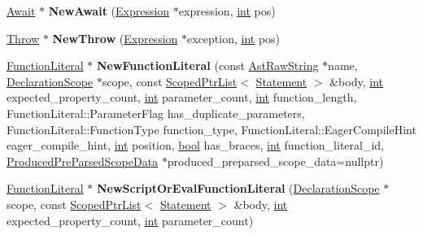\begin{DoxyCompactItemize}
\item 
\mbox{\label{classv8_1_1internal_1_1AstNodeFactory_abbd2b63d8ad08a73e63a917e9ab60847}} 
\mbox{\hyperlink{classv8_1_1internal_1_1Await}{Await}} $\ast$ {\bfseries New\+Await} (\mbox{\hyperlink{classv8_1_1internal_1_1Expression}{Expression}} $\ast$expression, \mbox{\hyperlink{classint}{int}} pos)
\item 
\mbox{\label{classv8_1_1internal_1_1AstNodeFactory_a1fdf2695d0243e1656cae73a01450f29}} 
\mbox{\hyperlink{classv8_1_1internal_1_1Throw}{Throw}} $\ast$ {\bfseries New\+Throw} (\mbox{\hyperlink{classv8_1_1internal_1_1Expression}{Expression}} $\ast$exception, \mbox{\hyperlink{classint}{int}} pos)
\item 
\mbox{\label{classv8_1_1internal_1_1AstNodeFactory_ad8aa2939934a2450217b7fa5eeca9d72}} 
\mbox{\hyperlink{classv8_1_1internal_1_1FunctionLiteral}{Function\+Literal}} $\ast$ {\bfseries New\+Function\+Literal} (const \mbox{\hyperlink{classv8_1_1internal_1_1AstRawString}{Ast\+Raw\+String}} $\ast$name, \mbox{\hyperlink{classv8_1_1internal_1_1DeclarationScope}{Declaration\+Scope}} $\ast$scope, const \mbox{\hyperlink{classv8_1_1internal_1_1ScopedPtrList}{Scoped\+Ptr\+List}}$<$ \mbox{\hyperlink{classv8_1_1internal_1_1Statement}{Statement}} $>$ \&body, \mbox{\hyperlink{classint}{int}} expected\+\_\+property\+\_\+count, \mbox{\hyperlink{classint}{int}} parameter\+\_\+count, \mbox{\hyperlink{classint}{int}} function\+\_\+length, Function\+Literal\+::\+Parameter\+Flag has\+\_\+duplicate\+\_\+parameters, Function\+Literal\+::\+Function\+Type function\+\_\+type, Function\+Literal\+::\+Eager\+Compile\+Hint eager\+\_\+compile\+\_\+hint, \mbox{\hyperlink{classint}{int}} position, \mbox{\hyperlink{classbool}{bool}} has\+\_\+braces, \mbox{\hyperlink{classint}{int}} function\+\_\+literal\+\_\+id, \mbox{\hyperlink{classv8_1_1internal_1_1ProducedPreParsedScopeData}{Produced\+Pre\+Parsed\+Scope\+Data}} $\ast$produced\+\_\+preparsed\+\_\+scope\+\_\+data=nullptr)
\item 
\mbox{\label{classv8_1_1internal_1_1AstNodeFactory_aa708ce9a873dde8c1338cd5109aecdf0}} 
\mbox{\hyperlink{classv8_1_1internal_1_1FunctionLiteral}{Function\+Literal}} $\ast$ {\bfseries New\+Script\+Or\+Eval\+Function\+Literal} (\mbox{\hyperlink{classv8_1_1internal_1_1DeclarationScope}{Declaration\+Scope}} $\ast$scope, const \mbox{\hyperlink{classv8_1_1internal_1_1ScopedPtrList}{Scoped\+Ptr\+List}}$<$ \mbox{\hyperlink{classv8_1_1internal_1_1Statement}{Statement}} $>$ \&body, \mbox{\hyperlink{classint}{int}} expected\+\_\+property\+\_\+count, \mbox{\hyperlink{classint}{int}} parameter\+\_\+count)

\end{DoxyCompactItemize}
